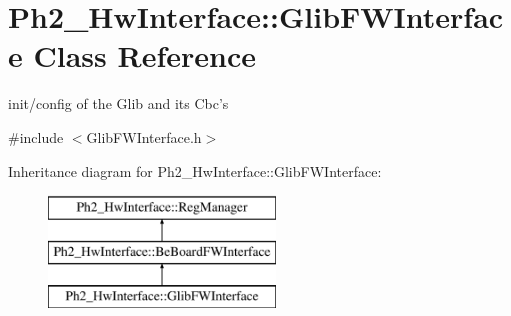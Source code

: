 \hypertarget{class_ph2___hw_interface_1_1_glib_f_w_interface}{\section{Ph2\-\_\-\-Hw\-Interface\-:\-:Glib\-F\-W\-Interface Class Reference}
\label{class_ph2___hw_interface_1_1_glib_f_w_interface}
}


init/config of the Glib and its Cbc's  




{\ttfamily \#include $<$Glib\-F\-W\-Interface.\-h$>$}

Inheritance diagram for Ph2\-\_\-\-Hw\-Interface\-:\-:Glib\-F\-W\-Interface\-:\begin{figure}[H]
\begin{center}
\leavevmode
\includegraphics[height=3.000000cm]{class_ph2___hw_interface_1_1_glib_f_w_interface}
\end{center}
\end{figure}
